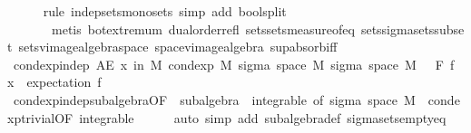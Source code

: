 \begin{isabellebody}
\ \ \ \ \isamarkupfalse%
\ {\isacharparenleft}{\kern0pt}rule\ indep{\isacharunderscore}{\kern0pt}sets{\isacharunderscore}{\kern0pt}mono{\isacharunderscore}{\kern0pt}sets{\isacharcomma}{\kern0pt}\ simp\ add{\isacharcolon}{\kern0pt}\ bool{\isachardot}{\kern0pt}split{\isacharparenright}{\kern0pt}\ \isanewline
\ \ \ \ \ \ \ {\isacharparenleft}{\kern0pt}metis\ bot{\isachardot}{\kern0pt}extremum\ dual{\isacharunderscore}{\kern0pt}order{\isachardot}{\kern0pt}refl\ sets{\isachardot}{\kern0pt}sets{\isacharunderscore}{\kern0pt}measure{\isacharunderscore}{\kern0pt}of{\isacharunderscore}{\kern0pt}eq\ sets{\isachardot}{\kern0pt}sigma{\isacharunderscore}{\kern0pt}sets{\isacharunderscore}{\kern0pt}subset{\isacharprime}{\kern0pt}\ sets{\isacharunderscore}{\kern0pt}vimage{\isacharunderscore}{\kern0pt}algebra{\isacharunderscore}{\kern0pt}space\ space{\isacharunderscore}{\kern0pt}vimage{\isacharunderscore}{\kern0pt}algebra\ sup{\isachardot}{\kern0pt}absorb{\isacharunderscore}{\kern0pt}iff{}{\isacharparenright}{\kern0pt}\isanewline
\ \ \isamarkupfalse%
\ cond{\isacharunderscore}{\kern0pt}exp{\isacharunderscore}{\kern0pt}indep{\isacharcolon}{\kern0pt}\ {\isachardoublequoteopen}AE\ x\ in\ M{\isachardot}{\kern0pt}\ cond{\isacharunderscore}{\kern0pt}exp\ M\ {\isacharparenleft}{\kern0pt}sigma\ {\isacharparenleft}{\kern0pt}space\ M{\isacharparenright}{\kern0pt}\ {\isacharparenleft}{\kern0pt}sigma\ {\isacharparenleft}{\kern0pt}space\ M{\isacharparenright}{\kern0pt}\ {\isacharbraceleft}{\kern0pt}{\isacharbraceright}{\kern0pt}\ {\isasymunion}\ F{\isacharparenright}{\kern0pt}{\isacharparenright}{\kern0pt}\ f\ x\ {\isacharequal}{\kern0pt}\ expectation\ f{\isachardoublequoteclose}\isanewline
\ \ \ \ \isamarkupfalse%
\ cond{\isacharunderscore}{\kern0pt}exp{\isacharunderscore}{\kern0pt}indep{\isacharunderscore}{\kern0pt}subalgebra{\isacharbrackleft}{\kern0pt}OF\ {\isacharunderscore}{\kern0pt}\ subalgebra\ {\isacharunderscore}{\kern0pt}\ integrable{\isacharcomma}{\kern0pt}\ of\ {\isachardoublequoteopen}sigma\ {\isacharparenleft}{\kern0pt}space\ M{\isacharparenright}{\kern0pt}\ {\isacharbraceleft}{\kern0pt}{\isacharbraceright}{\kern0pt}{\isachardoublequoteclose}{\isacharbrackright}{\kern0pt}\ cond{\isacharunderscore}{\kern0pt}exp{\isacharunderscore}{\kern0pt}trivial{\isacharbrackleft}{\kern0pt}OF\ integrable{\isacharbrackright}{\kern0pt}\isanewline
\ \ \ \ \isamarkupfalse%
\ {\isacharparenleft}{\kern0pt}auto\ simp\ add{\isacharcolon}{\kern0pt}\ subalgebra{\isacharunderscore}{\kern0pt}def\ sigma{\isacharunderscore}{\kern0pt}sets{\isacharunderscore}{\kern0pt}empty{\isacharunderscore}{\kern0pt}eq{\isacharparenright}{\kern0pt}\isanewline

\end{isabellebody}
